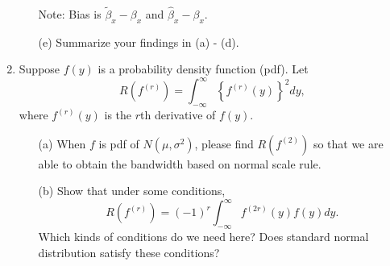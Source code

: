 \documentclass[11pt]{article}
\begin{document}
\begin{enumerate}
\begin{itemize}
\begin{table}[!ht]
\begin{tabular}{c c c c c}
 \hline 
\end{tabular}
\\
\tiny
Note: Bias is $\widetilde{\beta}_x - \beta_x $ and $\widehat{\beta}_x - \beta_x $. \ \ \ \ \ \ \ \ \ \ \  \ \ \ \ \ \ \ \ \ \ \ \ \ \ \ \ \ 
\end{table}




    
    \item[(e)] Summarize your findings in (a) - (d).
\end{itemize}



\item Suppose $f(y)$ is a probability density function (pdf). 
Let 
$$
R(f^{(r)})=\int_{-\infty}^{\infty}\left\{
f^{(r)}(y)
\right\}^2dy,  
$$
where $f^{(r)}(y)$ is the $r$th derivative of $f(y)$. 

\begin{itemize}
\item[(a)] When $f$ is pdf of $N(\mu,\sigma^2)$, please find $R(f^{(2)})$ so that we are able to obtain the bandwidth based on normal scale rule.


\item[(b)] Show that under some conditions,  
$$
R(f^{(r)})=(-1)^r\int_{-\infty}^{\infty}f^{(2r)}(y) f(y) dy.  
$$
Which kinds of conditions do we need here? Does standard normal distribution satisfy these conditions? 

\end{itemize}


\end{enumerate}
\end{document}
